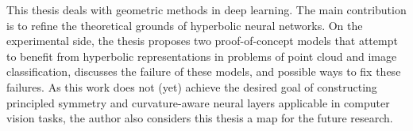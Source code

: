 This thesis deals with geometric methods in deep learning.  The main
contribution is to refine the theoretical grounds of hyperbolic neural
networks. On the experimental side, the thesis proposes two proof-of-concept
models that attempt to benefit from hyperbolic representations in problems of
point cloud and image classification, discusses the failure of these models,
and possible ways to fix these failures.  As this work does not (yet) achieve
the desired goal of constructing principled symmetry and curvature-aware neural
layers applicable in computer vision tasks, the author also considers this
thesis a map for the future research.
